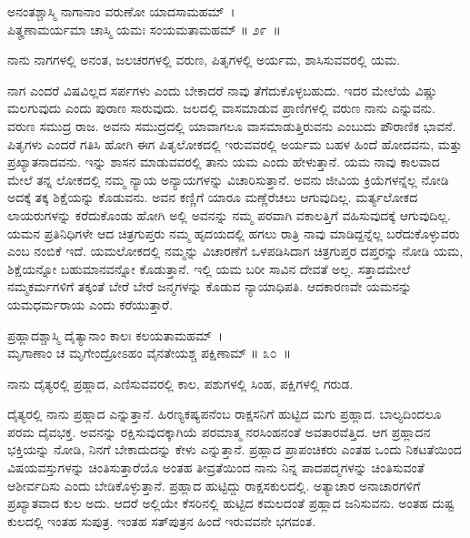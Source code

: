 \begin{shloka}
ಅನಂತಶ್ಚಾಸ್ಮಿ ನಾಗಾನಾಂ ವರುಣೋ ಯಾದಸಾಮಹಮ್~।\\ಪಿತೄಣಾಮರ್ಯಮಾ ಚಾಸ್ಮಿ ಯಮಃ ಸಂಯಮತಾಮಹಮ್ \hfill॥ ೨೯~॥
\end{shloka}

\begin{artha}
ನಾನು ನಾಗಗಳಲ್ಲಿ ಅನಂತ, ಜಲಚರಗಳಲ್ಲಿ ವರುಣ, ಪಿತೃಗಳಲ್ಲಿ ಅರ್ಯಮ, ಶಾಸಿಸುವವರಲ್ಲಿ ಯಮ.
\end{artha}

ನಾಗ ಎಂದರೆ ವಿಷವಿಲ್ಲದ ಸರ್ಪಗಳು ಎಂದು ಬೇಕಾದರೆ ನಾವು ತೆಗೆದುಕೊಳ್ಳಬಹುದು. ಇದರ ಮೇಲೆಯೆ ವಿಷ್ಣು ಮಲಗುವುದು ಎಂದು ಪುರಾಣ ಸಾರುವುದು. ಜಲದಲ್ಲಿ ವಾಸಮಾಡುವ ಪ್ರಾಣಿಗಳಲ್ಲಿ ವರುಣ ನಾನು ಎನ್ನುವನು. ವರುಣ ಸಮುದ್ರ ರಾಜ. ಅವನು ಸಮುದ್ರದಲ್ಲಿ ಯಾವಾಗಲೂ ವಾಸಮಾಡುತ್ತಿರುವನು ಎಂಬುದು ಪೌರಾಣಿಕ ಭಾವನೆ. ಪಿತೃಗಳು ಎಂದರೆ ಗತಿಸಿ ಹೋಗಿ ಈಗ ಪಿತೃಲೋಕದಲ್ಲಿ ಇರುವವರಲ್ಲಿ ಅರ್ಯಮ ಬಹಳ ಹಿಂದೆ ಹೋದವನು, ಮತ್ತು ಪ್ರಖ್ಯಾತನಾದವನು. ಇನ್ನು ಶಾಸನ ಮಾಡುವವರಲ್ಲಿ ತಾನು ಯಮ ಎಂದು ಹೇಳುತ್ತಾನೆ. ಯಮ ನಾವು ಕಾಲವಾದ ಮೇಲೆ ತನ್ನ ಲೋಕದಲ್ಲಿ ನಮ್ಮ ನ್ಯಾಯ ಅನ್ಯಾಯಗಳನ್ನು ವಿಚಾರಿಸುತ್ತಾನೆ. ಅವನು ಜೀವಿಯ ಕ್ರಿಯೆಗಳನ್ನೆಲ್ಲ ನೋಡಿ ಅದಕ್ಕೆ ತಕ್ಕ ಶಿಕ್ಷೆಯನ್ನು ಕೊಡುವನು. ಅವನ ಕಣ್ಣಿಗೆ ಯಾರೂ ಮಣ್ಣೆರೆಚಲು ಆಗುವುದಿಲ್ಲ. ಮರ್ತ್ಯಲೋಕದ ಲಾಯರುಗಳನ್ನು ಕರೆದುಕೊಂಡು ಹೋಗಿ ಅಲ್ಲಿ ಅವನನ್ನು ನಮ್ಮ ಪರವಾಗಿ ವಕಾಲತ್ತಿಗೆ ವಹಿಸುವುದಕ್ಕೆ ಆಗುವುದಿಲ್ಲ. ಯಮನ ಪ್ರತಿನಿಧಿಗಳೇ ಆದ ಚಿತ್ರಗುಪ್ತರು ನಮ್ಮ ಹೃದಯದಲ್ಲಿ ಹಗಲು ರಾತ್ರಿ ನಾವು ಮಾಡಿದ್ದನ್ನೆಲ್ಲ ಬರೆದುಕೊಳ್ಳುವರು ಎಂಬ ನಂಬಿಕೆ ಇದೆ. ಯಮಲೋಕದಲ್ಲಿ ನಮ್ಮನ್ನು ವಿಚಾರಣೆಗೆ ಒಳಪಡಿಸಿದಾಗ ಚಿತ್ರಗುಪ್ತರ ದಪ್ತರನ್ನು ನೋಡಿ ಯಮ, ಶಿಕ್ಷೆಯನ್ನೋ ಬಹುಮಾನವನ್ನೋ ಕೊಡುತ್ತಾನೆ. ಇಲ್ಲಿ ಯಮ ಬರೀ ಸಾವಿನ ದೇವತೆ ಅಲ್ಲ. ಸತ್ತಾದಮೇಲೆ ನಮ್ಮಕರ್ಮಗಳಿಗೆ ತಕ್ಕಂತೆ ಬೇರೆ ಬೇರೆ ಜನ್ಮಗಳನ್ನು ಕೊಡುವ ನ್ಯಾಯಾಧಿಪತಿ. ಆದಕಾರಣವೇ ಯಮನನ್ನು ಯಮಧರ್ಮರಾಯ ಎಂದು ಕರೆಯುತ್ತಾರೆ.

\begin{shloka}
ಪ್ರಹ್ಲಾದಶ್ಚಾಸ್ಮಿ ದೈತ್ಯಾನಾಂ ಕಾಲಃ ಕಲಯತಾಮಹಮ್~।\\ಮೃಗಾಣಾಂ ಚ ಮೃಗೇಂದ್ರೋಽಹಂ ವೈನತೇಯಶ್ಚ ಪಕ್ಷಿಣಾಮ್ \hfill॥ ೩೦~॥
\end{shloka}

\begin{artha}
ನಾನು ದೈತ್ಯರಲ್ಲಿ ಪ್ರಹ್ಲಾದ, ಎಣಿಸುವವರಲ್ಲಿ ಕಾಲ, ಪಶುಗಳಲ್ಲಿ ಸಿಂಹ, ಪಕ್ಷಿಗಳಲ್ಲಿ ಗರುಡ.
\end{artha}

ದೈತ್ಯರಲ್ಲಿ ನಾನು ಪ್ರಹ್ಲಾದ ಎನ್ನುತ್ತಾನೆ. ಹಿರಣ್ಯಕಷ್ಯಪನೆಂಬ ರಾಕ್ಷಸನಿಗೆ ಹುಟ್ಟಿದ ಮಗು ಪ್ರಹ್ಲಾದ. ಬಾಲ್ಯದಿಂದಲೂ ಪರಮ ದೈವಭಕ್ತ. ಅವನನ್ನು ರಕ್ಷಿಸುವುದಕ್ಕಾಗಿಯೆ ಪರಮಾತ್ಮ ನರಸಿಂಹನಂತೆ ಅವತಾರವೆತ್ತಿದ. ಆಗ ಪ್ರಹ್ಲಾದನ ಭಕ್ತಿಯನ್ನು ನೋಡಿ, ನಿನಗೆ ಬೇಕಾದುದನ್ನು ಕೇಳು ಎನ್ನುತ್ತಾನೆ. ಪ್ರಹ್ಲಾದ ಪ್ರಾಪಂಚಿಕರು ಎಂತಹ ಒಂದು ನಿಕಟತೆಯಿಂದ ವಿಷಯವಸ್ತುಗಳನ್ನು ಚಿಂತಿಸುತ್ತಾರೆಯೊ ಅಂತಹ ತೀವ್ರತೆಯಿಂದ ನಾನು ನಿನ್ನ ಪಾದಪದ್ಮಗಳನ್ನು ಚಿಂತಿಸುವಂತೆ ಆಶೀರ್ವದಿಸು ಎಂದು ಬೇಡಿಕೊಳ್ಳುತ್ತಾನೆ. ಪ್ರಹ್ಲಾದ ಹುಟ್ಟಿದ್ದು ರಾಕ್ಷಸಕುಲದಲ್ಲಿ. ಅತ್ಯಾಚಾರ ಅನಾಚಾರಗಳಿಗೆ ಪ್ರಖ್ಯಾತವಾದ ಕುಲ ಅದು. ಆದರೆ ಅಲ್ಲಿಯೇ ಕೆಸರಿನಲ್ಲಿ ಹುಟ್ಟಿದ ಕಮಲದಂತೆ ಪ್ರಹ್ಲಾದ ಜನಿಸುವನು. ಅಂತಹ ದುಷ್ಟ ಕುಲದಲ್ಲಿ ಇಂತಹ ಸುಪುತ್ರ. ಇಂತಹ ಸತ್​ಪುತ್ರನ ಹಿಂದೆ ಇರುವವನೇ ಭಗವಂತ.

